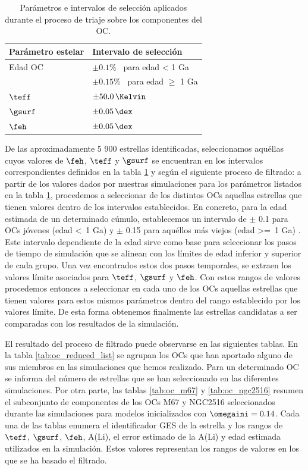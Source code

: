 \begin{table}
	\centering
	\begin{tabular}{ll} 
		\hline
		Parámetro estelar & Intervalo de selección\\
		\hline
		Edad OC & $\pm0.1\%$ \, para edad < 1 Ga \\
		& $\pm0.15\%$ \, para edad $\geq$ 1 Ga \\
		$\teff$ & $\pm 50.0 \, \Kelvin$ \\
		$\gsurf$ & $\pm 0.05 \, \dex$\\
		$\feh$ & $\pm 0.05 \, \dex$\\
		\hline
	\end{tabular}
	\caption{Parámetros e intervalos de selección aplicados durante el proceso de triaje sobre los componentes del OC.}
	\label{tab:sel_params}
\end{table}

De las aproximadamente 5 900 estrellas identificadas, seleccionamos aquéllas cuyos valores de $\feh$, $\teff$ y $\gsurf$ se encuentran en los intervalos correspondientes definidos en la tabla \ref{tab:sel_params} y según el siguiente proceso de filtrado: a partir de los valores dados por nuestras simulaciones para los parámetros listados en la tabla \ref{tab:sel_params}, procedemos a seleccionar de los distintos OCs aquellas estrellas que tienen valores dentro de los intervalos establecidos. En concreto, para la edad estimada de un determinado cúmulo, establecemos un intervalo de $\pm$ 0.1 para OCs jóvenes (edad <\, 1 Ga) y $\pm$ 0.15 para aquéllos más viejos (edad >=\, 1 Ga) \citep[véase][para más detalle sobre los valores referidos]{Cantat-Gaudin2020}. Este intervalo dependiente de la edad sirve como base para seleccionar los pasos de tiempo de simulación que se alinean con los límites de edad inferior y superior de cada grupo. Una vez encontrados estos dos pasos temporales, se extraen los valores límite asociados para $\teff$, $\gsurf$ y $\feh$. Con estos rangos de valores procedemos entonces a seleccionar en cada uno de los OCs aquellas estrellas que tienen valores para estos mismos parámetros dentro del rango establecido por los valores límite. De esta forma obtenemos finalmente las estrellas candidatas a ser comparadas con los resultados de la simulación.\par

El resultado del proceso de filtrado puede observarse en las siguientes tablas. En la tabla \ref{tab:oc_reduced_list} se agrupan los OCs que han aportado alguno de sus miembros en las simulaciones que hemos realizado. Para un determinado OC se informa del número de estrellas que se han seleccionado en las diferentes simulaciones. Por otra parte, las tablas \ref{tab:oc_m67} y \ref{tab:oc_ngc2516} resumen el subconjunto de componentes de los OCs M67 y NGC2516 seleccionados durante las simulaciones para modelos inicializados con $\omegaini = 0.14$. Cada una de las tablas enumera el identificador GES de la estrella y los rangos de $\teff$, $\gsurf$, $\feh$, A(Li), el error estimado de la A(Li) y edad estimada utilizados en la simulación. Estos valores representan los rangos de valores en los que se ha basado el filtrado.


